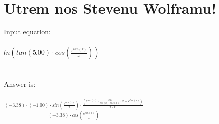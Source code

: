 \documentclass[25pt, a4paper]{article}
\begin{document}
\section*{Utrem nos Stevenu Wolframu!}

Input equation:\\\\

$ln( tan( 5.00) \cdot cos( \frac {e^{ tan( x)}}{x}))$\\\\\\
Answer is:\\\\

$\frac {(-3.38) \cdot (-1.00) \cdot sin( \frac {e^{ tan( x)}}{x}) \cdot \frac {(e^{ tan( x)} \cdot \frac {1.00}{cos( x) \cdot cos( x)} \cdot x - e^{ tan( x)})}{x \cdot x}}{(-3.38) \cdot cos( \frac {e^{ tan( x)}}{x})}$
\end{document}
